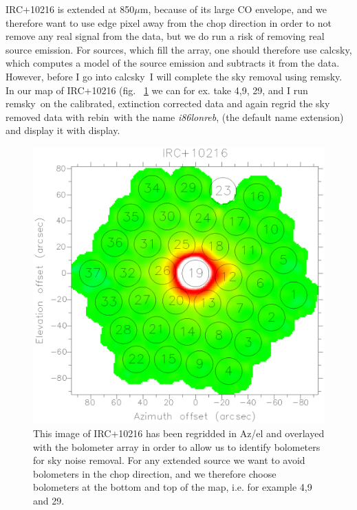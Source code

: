 \documentclass[twoside,11pt]{article}
\newcommand{\task}[1]{\textsf{#1}}
\newcommand{\rebin}{\xref{\task{rebin}}{sun216}{REBIN}}
\newcommand{\calcsky}{\xref{\task{calcsky}}{sun216}{CALCSKY}}
\newcommand{\remsky}{\xref{\task{remsky}}{sun216}{REMSKY}}
\newcommand{\display}{\xref{\task{display}}{sun95}{DISPLAY}}
\newcommand{\xref}[3]{#1}
\renewcommand{\_}{\texttt{\symbol{95}}}
\begin{document}
IRC+10216 is extended at 850$\mu$m, because of its large CO envelope,
and we therefore want to use edge pixel away from the chop direction in
order to not remove any real signal from the data, but we do run a risk
of removing real source emission. For sources, which fill the array,
one should therefore use \calcsky, which computes a model of the source
emission and subtracts it from the data. However, before I go into
\calcsky\, I will complete the sky removal using \remsky. In our map of
IRC+10216 (fig. \ \ref{fig:irc} we can for ex. take 4,9, 29, and I run
\remsky\ on the calibrated, extinction corrected data and again regrid
the sky removed data with \rebin\ with the name {\it i86\_lon\_reb}, (the
default name extension) and display it with \display.


\begin{figure}
\begin{center}
\includegraphics[width=\textwidth]{sho_fig3.eps}
\caption{This image of IRC+10216 has been regridded in Az/el and
overlayed with the bolometer array in order to allow us to identify
bolometers for sky noise removal. For any extended source we want to
avoid bolometers in the chop direction, and we therefore choose
bolometers at the bottom and top of the map, i.e. for example 4,9 and
29.}
\label{fig:irc}
\end{center}
\end{figure}
\end{document}
